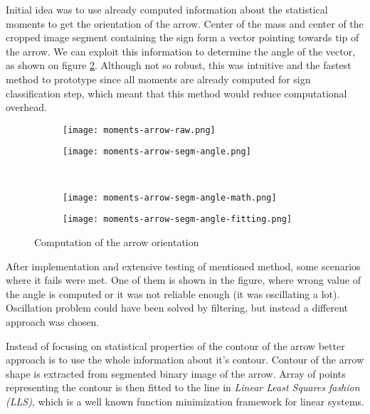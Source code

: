 Initial idea was to use already computed information about the statistical moments to get the orientation of the arrow. Center of the mass and center of the cropped image segment containing the sign form a vector pointing towards tip of the arrow. We can exploit this information to determine the angle of the vector, as shown on figure \ref{fig:arrow-angle-computation}. Although not so robust, this was intuitive and the fastest method to prototype since all moments are already computed for sign classification step, which meant that this method would reduce computational overhead.

\begin{figure}[th!]
	\centering
	\begin{subfigure}[b]{0.45\textwidth}
		\centering
		\texttt{[image: moments-arrow-raw.png]}
	\end{subfigure}
	\begin{subfigure}[b]{0.45\textwidth}
		\centering
		\texttt{[image: moments-arrow-segm-angle.png]}
	\end{subfigure}
	~
	\begin{subfigure}[b]{0.45\textwidth}
		\centering
		\texttt{[image: moments-arrow-segm-angle-math.png]}
	\end{subfigure}
	\begin{subfigure}[b]{0.45\textwidth}
		\centering
		\texttt{[image: moments-arrow-segm-angle-fitting.png]}
		\label{fig:line-fitting}
	\end{subfigure}
	\caption{Computation of the arrow orientation}
	\label{fig:arrow-angle-computation}
\end{figure}

After implementation and extensive testing of mentioned method, some scenarios where it fails were met. One of them is shown in the figure, where wrong value of the angle is computed or it was not reliable enough (it was oscillating a lot). Oscillation problem could have been solved by filtering, but instead a different approach was chosen.

Instead of focusing on statistical properties of the contour of the arrow better approach is to use the whole information about it's contour. Contour of the arrow shape is extracted from segmented binary image of the arrow. Array of points representing the contour is then fitted to the line in \textit{Linear Least Squares fashion (LLS)}, which is a well known function minimization framework for linear systems.

